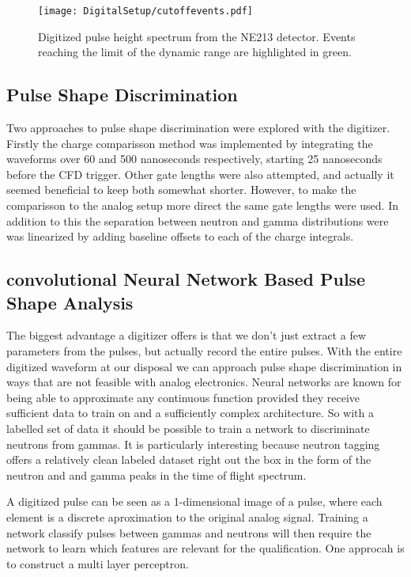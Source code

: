 \documentclass[main.tex]{subfiles}
\begin{document}
\begin{figure}[ht!]
    \centering
        \texttt{[image: DigitalSetup/cutoffevents.pdf]}
        \caption{Digitized pulse height spectrum from the NE213 detector. Events reaching the limit of the dynamic range are highlighted in green.}
    \label{fig:cutoffevents} 
\end{figure}


\subsection{Pulse Shape Discrimination}
Two approaches to pulse shape discrimination were explored with the digitizer. Firstly the charge comparisson method was implemented by integrating the waveforms over 60 and 500 nanoseconds respectively, starting 25 nanoseconds before the CFD trigger. Other gate lengths were also attempted, and actually it seemed beneficial to keep both somewhat shorter. However, to make the comparisson to the analog setup more direct the same gate lengths were used. In addition to this the separation between neutron and gamma distributions were was linearized by adding baseline offsets to each of the charge integrals.
\subsection{convolutional Neural Network Based Pulse Shape Analysis}
The biggest advantage a digitizer offers is that we don't just extract a few parameters from the pulses, but actually record the entire pulses. With the entire digitized waveform at our disposal we can approach pulse shape discrimination in ways that are not feasible with analog electronics. Neural networks are known for being able to approximate any continuous function provided they receive sufficient data to train on and a sufficiently complex architecture. So with a labelled set of data it should be possible to train a network to discriminate neutrons from gammas. It is particularly interesting because neutron tagging offers a relatively clean labeled dataset right out the box in the form of the neutron and and gamma peaks in the time of flight spectrum. 

A digitized pulse can be seen as a 1-dimensional image of a pulse, where each element is a discrete aproximation to the original analog signal. Training a network classify pulses between gammas and neutrons will then require the network to learn which features are relevant for the qualification. One approcah is to construct a multi layer perceptron. 
\end{document}
